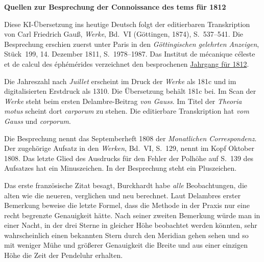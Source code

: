 \clearpage\thispagestyle{empty}
\begin{center}\textbf{Quellen zur Besprechung der Connoissance des tems für 1812}\end{center}
\noindent Diese KI-Übersetzung ins heutige Deutsch folgt der editierbaren Transkription von Carl Friedrich Gauß, \textit{Werke}, Bd.~VI (Göttingen, 1874), S.~537--541. Die Besprechung erschien zuerst unter Paris in den \textit{Göttingischen gelehrten Anzeigen}, Stück~199, 14. Dezember 1811, S.~1978--1987. Das Institut de mécanique céleste et de calcul des éphémérides verzeichnet den besprochenen \href{https://cdt.imcce.fr/items/show/161}{Jahrgang für 1812}.
\par\smallskip\noindent Die Jahreszahl nach \textit{Juillet} erscheint im Druck der \textit{Werke} als 181c und im digitalisierten Erstdruck als 1310. Die Übersetzung behält 181c bei. Im Scan der \textit{Werke} steht beim ersten Delambre-Beitrag \textit{von Gauss}. Im Titel der \textit{Theoria motus} scheint dort \textit{carporum} zu stehen. Die editierbare Transkription hat \textit{vom Gauss} und \textit{corporum}.
\par\smallskip\noindent Die Besprechung nennt das Septemberheft 1808 der \textit{Monatlichen Correspondenz}. Der zugehörige Aufsatz in den \textit{Werken}, Bd.~VI, S.~129, nennt im Kopf Oktober 1808. Das letzte Glied des Ausdrucks für den Fehler der Polhöhe auf S.~139 des Aufsatzes hat ein Minuszeichen. In der Besprechung steht ein Pluszeichen.
\par\smallskip\noindent Das erste französische Zitat besagt, Burckhardt habe \emph{alle} Beobachtungen, die alten wie die neueren, verglichen und neu berechnet. Laut Delambres erster Bemerkung beweise die letzte Formel, dass die Methode in der Praxis nur eine recht begrenzte Genauigkeit hätte. Nach seiner zweiten Bemerkung würde man in einer Nacht, in der drei Sterne in gleicher Höhe beobachtet werden könnten, sehr wahrscheinlich einen bekannten Stern durch den Meridian gehen sehen und so mit weniger Mühe und größerer Genauigkeit die Breite und aus einer einzigen Höhe die Zeit der Pendeluhr erhalten.
